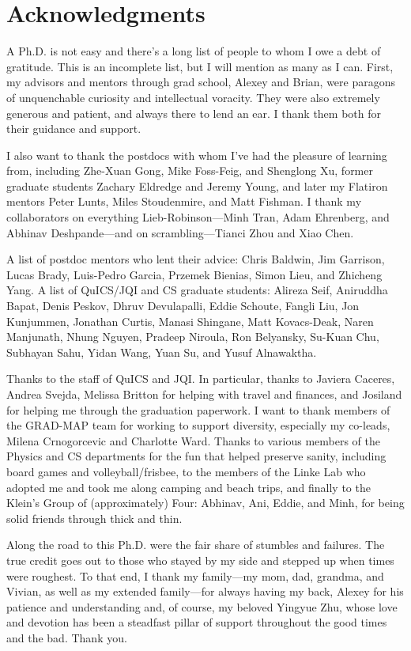 \chapter{Acknowledgments}
A Ph.D. is not easy and there's a long list of people to whom I owe a debt of gratitude. This is an incomplete list, but I will mention as many as I can.
First, my advisors and mentors through grad school, Alexey and Brian, were paragons of unquenchable curiosity and intellectual voracity. They were also extremely generous and patient, and always there to lend an ear. I thank them both for their guidance and support.

I also want to thank the postdocs with whom I've had the pleasure of learning from, including Zhe-Xuan Gong, Mike Foss-Feig, and Shenglong Xu, former graduate students Zachary Eldredge and Jeremy Young, and later my Flatiron mentors Peter Lunts, Miles Stoudenmire, and Matt Fishman. I thank my collaborators on everything Lieb-Robinson---Minh Tran, Adam Ehrenberg, and Abhinav Deshpande---and on scrambling---Tianci Zhou and Xiao Chen.

A list of postdoc mentors who lent their advice:
Chris Baldwin,
Jim Garrison,
Lucas Brady,
Luis-Pedro Garcia,
Przemek Bienias,
Simon Lieu, and
Zhicheng Yang.
A list of QuICS/JQI and CS graduate students:
Alireza Seif,
Aniruddha Bapat,
Denis Peskov,
Dhruv Devulapalli,
Eddie Schoute,
Fangli Liu,
Jon Kunjummen,
Jonathan Curtis,
Manasi Shingane,
Matt Kovacs-Deak,
Naren Manjunath,
Nhung Nguyen,
Pradeep Niroula,
Ron Belyansky,
Su-Kuan Chu,
Subhayan Sahu,
Yidan Wang,
Yuan Su, and
Yusuf Alnawaktha.

Thanks to the staff of QuICS and JQI. In particular, thanks to Javiera Caceres, Andrea Svejda, Melissa Britton for helping with travel and finances, and Josiland for helping me through the graduation paperwork.
I want to thank members of the GRAD-MAP team for working to support diversity, especially my co-leads, Milena Crnogorcevic and Charlotte Ward. Thanks to various members of the Physics and CS departments for the fun that helped preserve sanity, including board games and volleyball/frisbee, to the members of the Linke Lab who adopted me and took me along camping and beach trips, and finally to the Klein's Group of (approximately) Four: Abhinav, Ani, Eddie, and Minh, for being solid friends through thick and thin.

Along the road to this Ph.D. were the fair share of stumbles and failures. The true credit goes out to those who stayed by my side and stepped up when times were roughest. To that end, I thank my family---my mom, dad, grandma, and Vivian, as well as my extended family---for always having my back, Alexey for his patience and understanding and, of course, my beloved Yingyue Zhu, whose love and devotion has been a steadfast pillar of support throughout the good times and the bad. Thank you.
